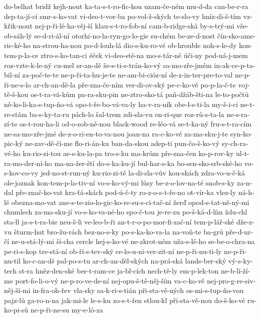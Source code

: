 do-belhat
bridž
kejh-nout
ka-ta-s-t-ro-fic-kou
uzam-če-ném
mu-d-da
can-be-r-ra
dep-ta-jí-cí
smr-s-ko-vat
vi-deo-t-vor-ba
po-vol-ž-ských
te-slo-vy
hníz-di-š-tím
vz-křik-nout
nej-p-ři-lé-ha-věj-ší
klau-s-t-ro-fob-ní
cam-b-ridge-ská
by-s-trý-mi
vše-ob-sáh-lý
se-d-ri-ál-ní
otorhi-no-la-ryn-go-lo-gie
su-chém
be-ze-d-nost
čín-sko-ame-ric-ké-ho
na-strou-ha-nou
po-d-louh-lá
dio-s-ku-ro-vé
ob-hrouble
noh-s-le-dy
kon-tem-p-la-ce
ztro-s-ko-tan-ci
éček
vi-deo-stě-na
mo-s-tár-ně
úči-ny
pod-ná-j-mem
roz-vzte-k-le-ný
cu-mel
sr-an-dě
še-s-ti-s-trán-ko-vý
sa-mo-zře-jmém
in-ak-ce-p-ta-bil-ní
za-poč-te-te
ne-p-ři-ta-hu-je-te
ne-am-bi-cióz-ní
de-z-in-ter-pre-to-val
ne-p-ři-ne-s-lo
ar-ch-an-dě-la
pře-zna-če-ním
ver-di-ov-ský
pe-c-ko-vě
po-p-la-č-te
voj-tě-š-kou
os-t-ra-vá-kům
pa-ra-sku-pin
ne-ztro-sko-tá
paň-džáb-šti-na
le-to-počtů
ně-ko-li-ka-s-tup-ňo-vá
opo-t-ře-bo-vá-va-ly
ha-v-ra-ník
obe-l-s-ti-la
my-š-i-ci
ne-t-re-stám
ba-s-ky-ta-ru
pách-lo
šal-trem
zdi-sla-vu
en-ri-que
roz-rů-s-ta-la
ne-s-ra-zí-te
os-t-rou-ha-li
od-o-sob-ně-nou
black-wood
re-léo-vá
se-t-ka-ný
fru-s-t-ra-cím
ne-sa-mo-zře-jmé
de-z-o-ri-en-to-va-nou
joan-na
ra-c-ko-vé
za-ma-sku-j-te
syn-ko-pic-ký
ne-zav-dě-čí-me
flo-ri-án-ku
ban-da-skou
adep-ti
pun-čo-š-ko-vý
sy-ch-ra-vé-ho
ku-rio-zi-tou
ae-s-ku-la-pa
tro-s-ku
ma-krům
pře-zna-čen
ko-p-rov-ky
ul-t-ra-mo-der-ní-ho
ma-na-žer-ští
do-s-ka-ku-jí
bul-har-s-ka
bo-sen-sko-srb-ské-ho
vo-s-kov-co-vy
jed-no-st-run-ný
ku-rio-zi-tě
la-di-sla-vův
kou-skách
zdra-vo-u-č-ká
ole-joznak
kon-tem-p-la-tiv-ní
vo-s-ko-vý-mi
lůsy
be-z-o-lov-na-té
snob-s-ky
za-n-dal
pře-znač-ko-vat
kra-ťá-skách
pod-ú-č-ty
ro-z-o-s-t-ře-no
ot-vír-ka
vlez-ly
ná-h-lé
obezna-mo-vat
ane-s-te-zio-lo-gic-ko-re-su-s-ci-tač-ní
žerď
opod-s-tat-ně-ný-mi
chumlech
za-ma-sku-jí
vo-s-ko-va-né-ho
spo-č-tou
je-re-zu
po-š-ká-d-lím
ždu-chl
sta-ll
ja-s-t-ra-bie
neu-š-li
ve-leo-b-ři
an-t-r-o-po-mor-fi-zač-ní
tem-p-lář-ské
dže-z-vu
šturm-hut
bro-žu-rách
bez-no-s-ky
po-s-ka-ko-va-la
na-voň-te
ba-grů
pře-d-ur-čí
ne-u-stá-lý-mi
ši-cha
cercle
hej-s-ko-vé
ne-zkrot-ném
uža-s-lé-ho
se-be-o-chra-na
pe-ri-s-kop
tre-stá-ní
ob-ří-s-tev-ský
ce-lo-u-ni-ver-zit-ní
ne-p-ři-nu-ti-ly
ne-p-ři-nu-til
ko-c-an-dě
pal-po-s-tu
ar-ch-an-děl-ských
na-prá-ská
lands-ber-ský
vý-s-ky-tech
st-ra
hněz-den-ské
ber-t-ram-ce
ja-bl-cích
nech-tě-ly
em-p-lek-ton
ne-b-lí-ží-me
port-fo-li-o-vý
ne-p-ro-ve-de-ní
nej-opu-š-tě-něj-ším
va-c-ko-vě
nej-pro-g-re-siv-něj-ší-mi
in-fra-oh-řev
vla-sky
sa-k-ri-s-tián
při-sta-vě-ných
os-mi-s-tup-ňo-vou
pajz-lů
ga-ro-n-na
jak-mi-le
le-s-ku
zo-s-t-řen
stlou-kl
při-sta-vě-nou
do-š-ko-vé
ru-ko-pi-sů
ne-p-ři-ne-su
my-e-ló-za
